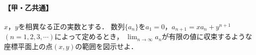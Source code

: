 \documentclass[../../main.tex]{subfiles}
\begin{document}
\paragraph{【甲・乙共通】}
$x$，$y$を相異なる正の実数とする．
数列$\{ a_n \}$を$a_1=0$，$a_{n+1}=xa_n+y^{n+1}$ $(n=1,2,3,\cdots)$によって定めるとき，
$\displaystyle\lim_{n\to\infty}a_n$が有限の値に収束するような座標平面上の点$(x,y)$の範囲を図示せよ．
\end{document}

